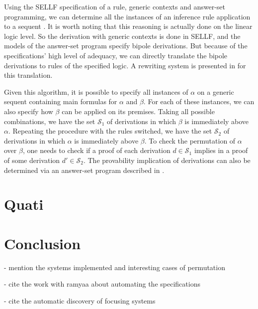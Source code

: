 \documentclass{llncs}
\begin{document}
Using the SELLF specification of a rule, generic contexts and answer-set
programming, we can determine all the instances of an inference rule
application to a sequent \cite{iclp}. It is worth noting that this reasoning is
actually done on the linear logic level. So the derivation with generic contexts
is done in SELLF, and the models of the answer-set program specify bipole
derivations. But because of the specifications' high level of adequacy, we can
directly translate the bipole derivations to rules of the specified logic. A
rewriting system is presented in \cite{iclp} for this translation.

Given this algorithm, it is possible to specify all instances of $\alpha$ on a
generic sequent containing main formulas for $\alpha$ and $\beta$. For each of
these instances, we can also specify how $\beta$ can be applied on its premises.
Taking all possible combinations, we have the set $\mathcal{S}_1$ of
derivations in which $\beta$ is immediately above $\alpha$. Repeating the
procedure with the rules switched, we have the set $\mathcal{S}_2$ of
derivations in which $\alpha$ is immediately above $\beta$. To check the
permutation of $\alpha$ over $\beta$, one needs to check if a proof of each
derivation $d \in \mathcal{S}_1$ implies in a proof of some derivation $d' \in
\mathcal{S}_2$. The provability implication of derivations can also be
determined via an answer-set program described in \cite{iclp}.

\section{Quati}
\label{sec:quati}


\section{Conclusion}
\label{sec:conclusion}

- mention the systems implemented and interesting cases of permutation

- cite the work with ramyaa about automating the specifications

- cite the automatic discovery of focusing systems
\end{document}
